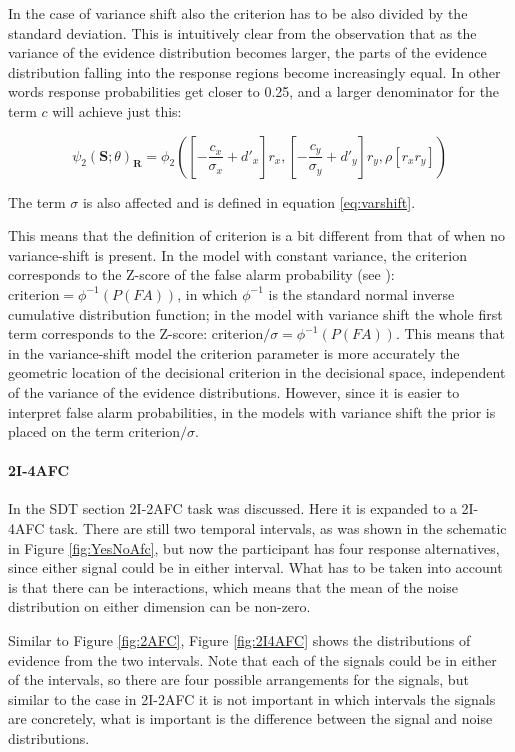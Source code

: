 \documentclass{article}\usepackage{knitr}
\begin{document}
In the case of variance shift also the criterion has to be also divided by the standard deviation. This is intuitively clear from the observation that as the variance of the evidence distribution becomes larger, the parts of the evidence distribution falling into the response regions become increasingly equal. In other words response probabilities get closer to 0.25, and a larger denominator for the term $c$ will achieve just this:

\begin{equation}
\psi_2(\bm{S}; \theta)_{\bm{R}} = \phi_2([-\frac{c_x}{\sigma_x} + d'_x]r_x, [-\frac{c_y}{\sigma_y} + d'_y] r_y, \rho [r_x r_y])
\label{eq:generalPfun_varshift}
\end{equation}  

The term $\sigma$ is also affected  and is defined in equation \ref{eq:varshift}.

This means that the definition of criterion is a bit different from that of when no variance-shift is present. In the model with constant variance, the criterion corresponds to the Z-score of the false alarm probability (see \citet[Chapter 6]{kingdomprins2010}): $\text{criterion} = \phi^{-1}(P(FA))$, in which $\phi^{-1}$ is the standard normal inverse cumulative distribution function; in the model with variance shift the whole first term corresponds to the Z-score: $\text{criterion}/\sigma = \phi^{-1}(P(FA))$. This means that in the variance-shift model the criterion parameter is more accurately the geometric location of the decisional criterion in the decisional space, independent of the variance of the evidence distributions. However, since it is easier to interpret false alarm probabilities, in the models with variance shift the prior is placed on the term $\text{criterion}/\sigma$.

\paragraph{2I-4AFC}

In the SDT section 2I-2AFC task was discussed. Here it is expanded to a 2I-4AFC task. There are still two temporal intervals, as was shown in the schematic in Figure \ref{fig:YesNoAfc}, but now the participant has four response alternatives, since either signal could be in either interval. What has to be taken into account is that there can be interactions, which means that the mean of the noise distribution on either dimension can be non-zero. 

Similar to Figure \ref{fig:2AFC}, Figure \ref{fig:2I4AFC} shows the distributions of evidence from the two intervals. Note that each of the signals could be in either of the intervals, so there are four possible arrangements for the signals, but similar to the case in 2I-2AFC it is not important in which intervals the signals are concretely, what is important is the difference between the signal and noise distributions. 
\end{document}
